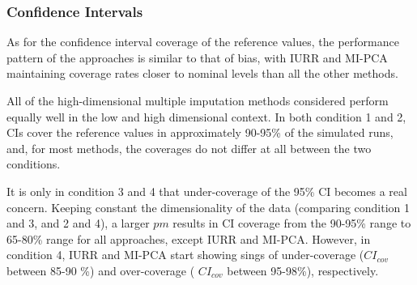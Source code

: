\subsubsection{Confidence Intervals} 

As for the confidence interval coverage of the reference values, the performance pattern of the approaches is similar
to that of bias, with IURR and MI-PCA maintaining coverage rates closer to nominal levels than all the other methods. 

All of the high-dimensional multiple imputation methods considered perform equally well in the low and high dimensional 
context. In both condition 1 and 2, CIs cover the reference values in approximately 90-95\% of the simulated runs, and, 
for most methods, the coverages do not differ at all between the two conditions.

It is only in condition 3 and 4 that under-coverage of the 95\% CI becomes a real concern. 
Keeping constant the dimensionality of the data (comparing condition 1 and 3, and 2 and 4), a larger $pm$ results in CI 
coverage from the 90-95\% range to 65-80\% range for all approaches, except IURR and MI-PCA. However, in condition 4, 
IURR and MI-PCA start showing sings of under-coverage ($CI_{cov}$ between 85-90 \%) and over-coverage ( $CI_{cov}$ between 
95-98\%), respectively.
